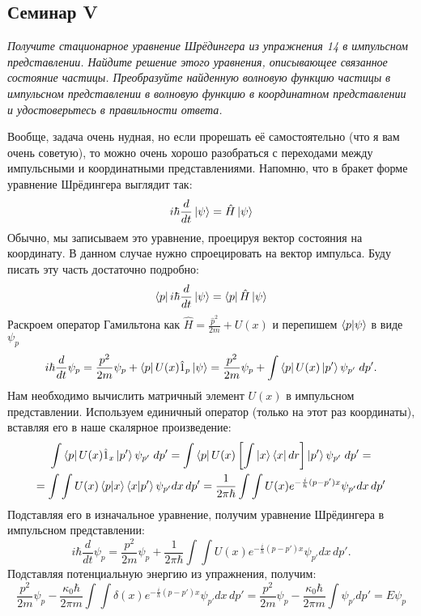 \begin{center}
    \section{Семинар V}
\end{center}
\begin{center}
    \textit{Получите стационарное уравнение Шрёдингера из упражнения 14 в импульсном представлении. Найдите решение этого уравнения, описывающее связанное состояние частицы. Преобразуйте найденную волновую функцию частицы в импульсном представлении в волновую функцию в координатном представлении и удостоверьтесь в правильности ответа.}
\end{center}
Вообще, задача очень нудная, но если прорешать её самостоятельно (что я вам очень советую), то можно очень хорошо разобраться с переходами между импульсными и координатными представлениями. Напомню, что в бракет форме уравнение Шрёдингера выглядит так:
\[
i\hbar \frac{d}{dt} \ket{\psi} = \hat H \ket{\psi}
\]
Обычно, мы записываем это уравнение, проецируя вектор состояния на координату. В данном случае нужно спроецировать на вектор импульса. Буду писать эту часть достаточно подробно:
\[
\bra{p} i\hbar \frac{d}{dt} \ket{\psi} = \bra{p} \hat H \ket{\psi}
\]
Раскроем оператор Гамильтона как $\hat H = \frac{\hat p^2}{2m} + U(x)$ и перепишем $\bra{p}\ket{\psi}$ в виде $\psi_p$
\[
i\hbar \frac{d}{dt} \psi_p = \frac{p^2}{2m}\psi_p + \bra{p}U(x)\hat{1}_p\ket{\psi} = \frac{p^2}{2m}\psi_p + \int\bra{p}U(x)\ket{p'}\psi_{p'}\;dp'.
\]
Нам необходимо вычислить матричный элемент $U(x)$ в импульсном представлении. Используем единичный оператор (только на этот раз координаты), вставляя его в наше скалярное произведение:
\begin{gather*}
\int\bra{p}U(x)\hat{1}_x\ket{p'}\psi_{p'}\;dp' = \int \bra{p}U(x)\left[\int\ket{x}\bra{x}dr\right]\ket{p'} \psi_{p'}\;dp'= \\
= \int\int U(x)\bra{p}\ket{x}\bra{x}\ket{p'} \psi_{p'} dx\,dp' = \frac{1}{2\pi\hbar}\int\int U(x) e^{-\frac{i}{h}(p-p')x}\psi_{p'} dx\,dp'
\end{gather*}
Подставляя его в изначальное уравнение, получим уравнение Шрёдингера в импульсном представлении:
\[
i\hbar \frac{d}{dt} \psi_p =\frac{p^2}{2m}\psi_p + \frac{1}{2\pi\hbar}\int\int U(x) e^{-\frac{i}{h}(p-p')x}\psi_{p'} dx\,dp'.
\]
Подставляя потенциальную энергию из упражнения, получим:
\[
\frac{p^2}{2m}\psi_p - \frac{\kappa_0\hbar}{2\pi m}\int\int \delta(x) e^{-\frac{i}{h}(p-p')x}\psi_{p'} dx\,dp'= \frac{p^2}{2m}\psi_p - \frac{\kappa_0\hbar}{2\pi m}\int\psi_{p'} dp' =  E\psi_p
\]
